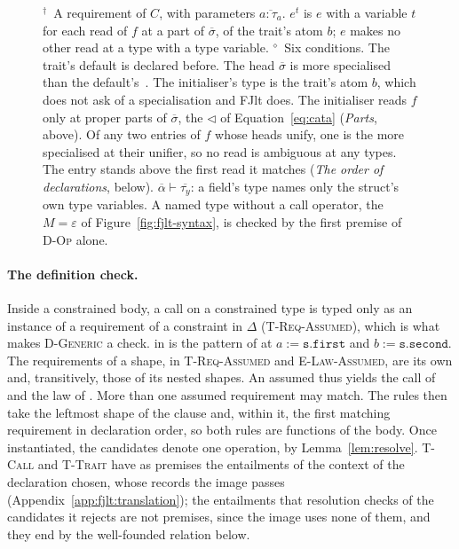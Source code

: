 \begin{figure}[htbp]
{$^{\dagger}$~A requirement of $C$, with parameters $\overline{a : \tau_a}$.
$e^{t}$ is $e$ with a variable $t$ for each read of $f$ at a part of $\overline{\sigma}$, of the trait's atom $b$; $e$ makes no other read at a type with a type variable. $^{\diamond}$~Six conditions. The trait's default is declared before. The head $\overline{\sigma}$ is more specialised than the default's~\cite[{\texttt{temp.spec.partial}}]{cpp23standard}. The initialiser's type is the trait's atom $b$, which \Cpp{} does not ask of a specialisation and FJlt does. The initialiser reads $f$ only at proper parts of $\overline{\sigma}$, the $\triangleleft$ of Equation~\eqref{eq:cata} (\emph{Parts}, above). Of any two entries of $f$ whose heads unify, one is the more specialised at their unifier, so no read is ambiguous at any types. The entry stands above the first read it matches (\emph{The order of declarations}, below).
$\overline{\alpha} \vdash \overline{\tau_y}$: a field's type names only the struct's own type variables.
A named type without a call operator, the $M = \varepsilon$ of Figure~\ref{fig:fjlt-syntax}, is checked by the first premise of \textsc{D-Op} alone.}
\label{fig:fjlt-declarations}
\end{figure}

\paragraph{The definition check.}
Inside a constrained body, a call on a constrained type is typed only as an instance of a requirement of a constraint in $\Delta$ (\textsc{T-Req-Assumed}), which is what makes \textsc{D-Generic} a check.
 in  is the pattern  of  at $a := \texttt{s.first}$ and $b := \texttt{s.second}$.
The requirements of a shape, in \textsc{T-Req-Assumed} and \textsc{E-Law-Assumed}, are its own and, transitively, those of its nested shapes.
An assumed  thus yields the call of  and the law  of .
More than one assumed requirement may match.
The rules then take the leftmost shape of the  clause and, within it, the first matching requirement in declaration order, so both rules are functions of the body.
Once instantiated, the candidates denote one operation, by Lemma~\ref{lem:resolve}.
\textsc{T-Call} and \textsc{T-Trait} have as premises the entailments of the context of the declaration chosen, whose records the image passes (Appendix~\ref{app:fjlt:translation}); the entailments that resolution checks of the candidates it rejects are not premises, since the image uses none of them, and they end by the well-founded relation below.

